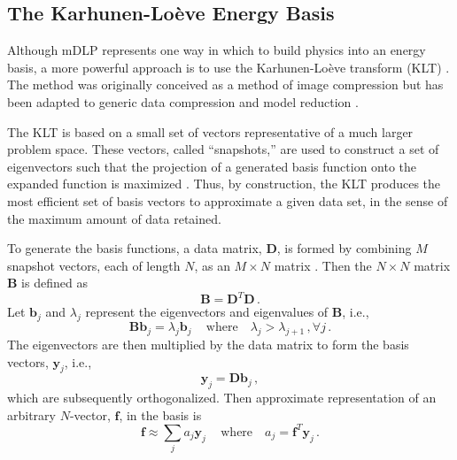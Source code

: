 \documentclass{anstrans}
\begin{document}
\subsection{The  Karhunen-Lo\`{e}ve Energy Basis}

Although mDLP represents one way in which to build physics into an energy basis,
 a more powerful approach is to use the Karhunen-Lo\`{e}ve transform (KLT)
\cite{Dony2001}. The method was originally conceived as a method of image
compression but has been adapted to generic data compression \cite{Buchan2013}
and model reduction \cite{Sirovich1987}.

The KLT is based on a small set of vectors representative of a much larger
problem space. These vectors, called ``snapshots,'' are used to construct a set
of eigenvectors such that the projection of a generated basis function onto the
expanded function is maximized \cite{Sirovich1987}. Thus, by construction, the
KLT
produces the most efficient set of basis vectors to approximate a given data
set, in the sense of the maximum amount of data retained.

To generate the basis functions, a data matrix, $\mathbf{D}$, is formed by
combining $M$ snapshot vectors, each of length $N$, as an $M \times N$ matrix
\cite{Meyer2002}.  Then the $N \times N$ matrix $\mathbf{B}$ is defined as
\begin{equation}
 \mathbf{B} = \mathbf{D}^{T}\mathbf{D} \, .
\end{equation}
Let $\mathbf{b}_j$ and $\lambda_j$ represent the eigenvectors and
eigenvalues of $\mathbf{B}$, i.e.,
\begin{equation}
 \mathbf{Bb}_j = \lambda_j \mathbf{b}_j \,  \quad \text{where} \quad \lambda_j > \lambda_{j+1} \, , \forall j \, .
\end{equation}
The eigenvectors are then multiplied by the data matrix to form the basis vectors, $\mathbf{y}_j$, i.e.,
\begin{equation}
 \mathbf{y}_j = \mathbf{D}\mathbf{b}_j \, ,
\end{equation}
which are subsequently orthogonalized.  Then approximate representation of an arbitrary $N$-vector, $\mathbf{f}$, in the basis is
\begin{equation}
 \mathbf{f} \approx \sum_j a_j \mathbf{y}_j \, \quad \text{where} \quad a_j = \mathbf{f}^T \mathbf{y}_j \, .
\end{equation}
\end{document}
